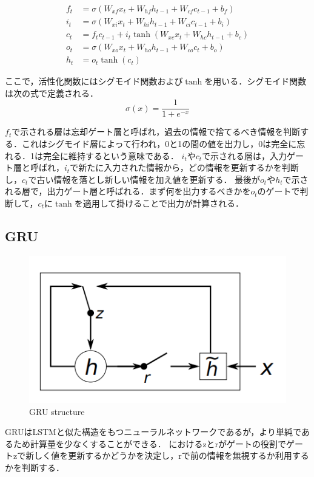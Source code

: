 \begin{align}\label{eq:LSTM}
	f_t & = \sigma(W_{xf} x_t + W_{hf} h_{t-1} + W_{cf} c_{t-1} + b_f ) \\
	i_t & = \sigma(W_{xi} x_t + W_{hi} h_{t-1} + W_{ci} c_{t-1} + b_i) \\
	c_t & = f_t c_{t-1} + i_t \tanh(W_{xc} x_t + W_{hc} h_{t-1} + b_c) \\
	o_t & = \sigma(W_{xo} x_t + W_{ho} h_{t-1} + W_{co} c_t + b_o) \\
	h_t & = o_t \tanh(c_t) 
\end{align}

ここで，活性化関数にはシグモイド関数および$\tanh$を用いる．シグモイド関数は次の式で定義される．
\begin{equation}\label{eq:sigmoid}
	\sigma (x) = \dfrac{1}{1 + e^{-x}}
\end{equation}

$f_t$で示される層は忘却ゲート層と呼ばれ，過去の情報で捨てるべき情報を判断する．これはシグモイド層によって行われ，0と1の間の値を出力し，0は完全に忘れる．1は完全に維持するという意味である．
$i_t$や$c_t$で示される層は，入力ゲート層と呼ばれ，$i_t$で新たに入力された情報から，どの情報を更新するかを判断し，$c_t$で古い情報を落とし新しい情報を加え値を更新する．
最後が$o_t$や$h_t$で示される層で，出力ゲート層と呼ばれる．まず何を出力するべきかを$o_t$のゲートで判断して，$c_t$に$\tanh$を適用して掛けることで出力が計算される．

\subsection*{GRU}
\begin{figure}
	\centering
	\includegraphics[width=0.7\linewidth]{fig/chapter2/gru}
	\caption{GRU structure}
	\label{fig:gru}
\end{figure}

 GRUはLSTMと似た構造をもつニューラルネットワークであるが，より単純であるため計算量を少なくすることができる．\cite{cho2014learning}
におけるzとrがゲートの役割でゲートzで新しく値を更新するかどうかを決定し，rで前の情報を無視するか利用するかを判断する．

